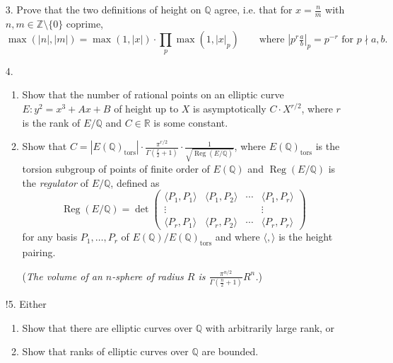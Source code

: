 \documentclass[a4paper]{article}
\theoremstyle{plain}
\theoremstyle{remark}
\theoremstyle{definition}
\DeclareMathOperator{\Reg}{Reg}
\newcommand{\tors}{\text{tors}}
\newcommand{\Z}{\mathbb{Z}}
\newcommand{\Q}{\mathbb{Q}}
\newcommand{\R}{\mathbb{R}}
\begin{document}
\begin{enumerate}
    \item[3.] Prove that the two definitions of height on $\Q$ agree, i.e. that
        for $x=\frac{n}{m}$ with $n,m\in\Z\setminus\{0\}$ coprime,
        \begin{equation*}
            \max(|n|,|m|) = \max(1,|x|)\cdot\prod_p\max(1,|x|_p)
            \qquad \text{where $|p^r\tfrac{a}{b}|_p=p^{-r}$ for $p\nmid a,b$.}
        \end{equation*}

    \item[4.]
        \begin{enumerate}[label=(\roman*)]
            \item Show that the number of rational points on an elliptic curve
                $E:y^2=x^3+Ax+B$ of height up to $X$ is asymptotically
                $C\cdot X^{r/2}$, where $r$ is the rank of $E/\Q$ and $C\in\R$
                is some constant.

            \item Show that
                $C=|E(\Q)_\tors|\cdot\frac{\pi^{r/2}}{\Gamma(\frac{r}{2}+1)}
                \cdot\frac{1}{\sqrt{\Reg(E/\Q)}}$, where $E(\Q)_\tors$ is the
                torsion subgroup of points of finite order of $E(\Q)$ and
                $\Reg(E/\Q)$ is the \emph{regulator} of $E/\Q$, defined as
                \begin{equation*}
                    \Reg(E/\Q) = \det\begin{pmatrix}
                        \langle P_1,P_1\rangle & \langle P_1,P_2\rangle
                            & \cdots & \langle P_1,P_r\rangle \\
                        \vdots & & & \vdots \\
                        \langle P_r,P_1\rangle & \langle P_r,P_2\rangle
                            & \cdots & \langle P_r,P_r\rangle
                    \end{pmatrix}
                \end{equation*}
                for any basis $P_1,\ldots,P_r$ of $E(\Q)/E(\Q)_\tors$ and where
                $\langle,\rangle$ is the height pairing.

                (\textit{The volume of an $n$-sphere of radius $R$ is
                $\frac{\pi^{n/2}}{\Gamma(\frac{n}{2}+1)}R^n$.})
        \end{enumerate}

    \item[!5.] Either
        \begin{enumerate}[label=(\roman*)]
            \item Show that there are elliptic curves over $\Q$ with arbitrarily
                large rank, or
            \item Show that ranks of elliptic curves over $\Q$ are bounded.
        \end{enumerate}
\end{enumerate}
\end{document}
